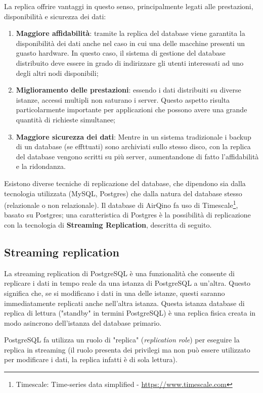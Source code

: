 La replica offrire vantaggi in questo senso, principalmente legati alle prestazioni, disponibilità e sicurezza dei dati:
\begin{enumerate}
  \item \textbf{Maggiore affidabilità}: tramite la replica del database viene garantita la disponibilità dei dati anche nel caso in cui una delle macchine presenti un guasto hardware. In questo caso, il sistema di gestione del database distribuito deve essere in grado di indirizzare gli utenti interessati ad uno degli altri nodi disponibili;
  \item \textbf{Miglioramento delle prestazioni}: essendo i dati distribuiti su diverse istanze, accessi multipli non saturano i server. Questo aspetto risulta particolarmente importante per applicazioni che possono avere una grande quantità di richieste simultanee;
  \item \textbf{Maggiore sicurezza dei dati}: Mentre in un sistema tradizionale i backup di un database (se effttuati) sono archiviati sullo stesso disco, con la replica del database vengono scritti su più server, aumentandone di fatto l'affidabilità e la ridondanza.
\end{enumerate}

Esistono diverse tecniche di replicazione del database, che dipendono sia dalla tecnologia utilizzata (MySQL, Postgres) che dalla natura del database stesso (relazionale o non relazionale). Il database di AirQino fa uso di Timescale\footnote{Timescale: Time-series data simplified - \url{https://www.timescale.com}}, basato su Postgres; una caratteristica di Postgres è la possibilità di replicazione con la tecnologia di \textbf{Streaming Replication}, descritta di seguito.

\subsection{Streaming replication}\label{ssec:streaming-replication}
La streaming replication di PostgreSQL è una funzionalità che consente di replicare i dati in tempo reale da una istanza di PostgreSQL a un'altra. Questo significa che, se si modificano i dati in una delle istanze, questi saranno immediatamente replicati anche nell'altra istanza. Questa istanza database di replica di lettura ("standby" in termini PostgreSQL) è una replica fisica creata in modo asincrono dell'istanza del database primario.

PostgreSQL fa utilizza un ruolo di "replica" (\textit{replication role}) per eseguire la replica in streaming (il ruolo presenta dei privilegi ma non può essere utilizzato per modificare i dati, la replica infatti è di sola lettura).

